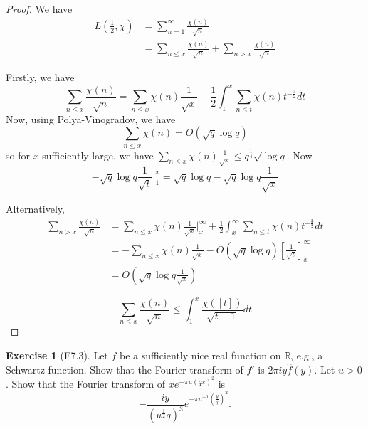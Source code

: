 \documentclass[reqno]{amsart}
\theoremstyle{definition}
\newtheorem{exercise}[theorem]{Exercise}
\theoremstyle{remark}
\begin{document}
\begin{proof}
    We have
    \begin{align*}
        L \left( \frac{1}{2},\chi \right) 
        &= \sum_{n =1}^{\infty} \frac{\chi(n)}{\sqrt{n} }\\
        &= \sum_{n\le x} \frac{\chi(n)}{\sqrt{n} }
        + \sum_{n>x} \frac{\chi(n)}{\sqrt{n} }
    \end{align*}

    Firstly, we have
    \[
    \sum_{n\le x} \frac{\chi(n)}{\sqrt{n} }
    = \sum_{n\le x}\chi(n) \frac{1}{\sqrt{x} } + \frac{1}{2} 
    \int_{1}^{x} \sum_{n\le t}\chi(n) t^{-\frac{3}{2}}  dt
    \] 
    Now, using Polya-Vinogradov, we have
    \[
    \sum_{n\le x} \chi(n) = O\left( \sqrt{q} 
    \log q \right) 
    \] 
    so for $x$ sufficiently large, we have
    $\sum_{n\le x} \chi(n) \frac{1}{\sqrt{x} }
    \le q^{\frac{1}{4}} \sqrt{\log q} $.
    Now
    \[
    - \sqrt{q}  \log q
    \frac{1}{\sqrt{t} } \bigg|_{1}^{x}
    =
    \sqrt{q} \log q - \sqrt{q}  \log q \frac{1}{\sqrt{x} }
    \] 


    Alternatively,
    \begin{align*}
        \sum_{n>x} \frac{\chi(n)}{\sqrt{n} }
        &= \sum_{n\le x} \chi(n) \frac{1}{\sqrt{x} }
        \bigg|_{x}^{\infty} + \frac{1}{2}
        \int_{x}^{\infty} \sum_{n\le t} \chi(n) t^{-\frac{3}{2}} dt\\
        &=  - \sum_{n\le x}\chi(n) \frac{1}{\sqrt{x} }
        -  O\left( \sqrt{q} \log q \right)
        \left[ \frac{1}{\sqrt{t} } \right]_{x}^{\infty}\\
        &= O \left( \sqrt{q}  \log q \frac{1}{\sqrt{x} } \right)  
    \end{align*}

    \[
    \sum_{n\le x} \frac{\chi(n)}{\sqrt{n} }
    \le 
    \int_{1}^{x} \frac{\chi \left( \left[ t \right]  \right) }{
    \sqrt{t-1} } dt 
\] 




\end{proof}

\begin{exercise}[E7.3]
    Let $f$ be a sufficiently nice real function on
    $\mathbb{R}$, e.g., a Schwartz function. Show that
    the Fourier transform of $f'$ is
    $2\pi i y  \hat{f}(y)$. Let
    $u > 0$. Show that the Fourier transform of
    $xe^{- \pi u \left( qx \right)^2}$ is 
    \[
    - \frac{iy}{\left( u^{\frac{1}{2}}q \right)^3 } 
    e^{-\pi u^{-1} \left( \frac{y}{q} \right)^2}.
    \] 
\end{exercise}
\end{document}
